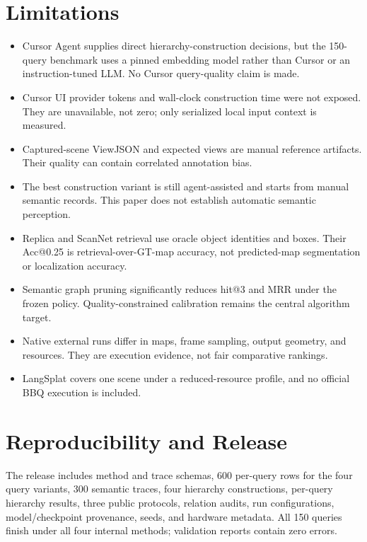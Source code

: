 \documentclass[10pt,twocolumn,letterpaper]{article}
\begin{document}
\section{Limitations}
\begin{itemize}
  \item Cursor Agent supplies direct hierarchy-construction decisions, but the
  150-query benchmark uses a pinned embedding model rather than Cursor or an
  instruction-tuned LLM. No Cursor query-quality claim is made.
  \item Cursor UI provider tokens and wall-clock construction time were not
  exposed. They are unavailable, not zero; only serialized local input context
  is measured.
  \item Captured-scene ViewJSON and expected views are manual reference
  artifacts. Their quality can contain correlated annotation bias.
  \item The best construction variant is still agent-assisted and starts from
  manual semantic records. This paper does not establish automatic semantic
  perception.
  \item Replica and ScanNet retrieval use oracle object identities and boxes.
  Their Acc@0.25 is retrieval-over-GT-map accuracy, not predicted-map
  segmentation or localization accuracy.
  \item Semantic graph pruning significantly reduces hit@3 and MRR under the
  frozen policy. Quality-constrained calibration remains the central algorithm
  target.
  \item Native external runs differ in maps, frame sampling, output geometry,
  and resources. They are execution evidence, not fair comparative rankings.
  \item LangSplat covers one scene under a reduced-resource profile, and no
  official BBQ execution is included.
\end{itemize}

\section{Reproducibility and Release}
The release includes method and trace schemas, 600 per-query rows for the four
query variants, 300 semantic traces, four hierarchy constructions, per-query
hierarchy results, three public protocols, relation audits, run configurations,
model/checkpoint provenance, seeds, and hardware metadata. All 150 queries
finish under all four internal methods; validation reports contain zero
errors.
\end{document}
